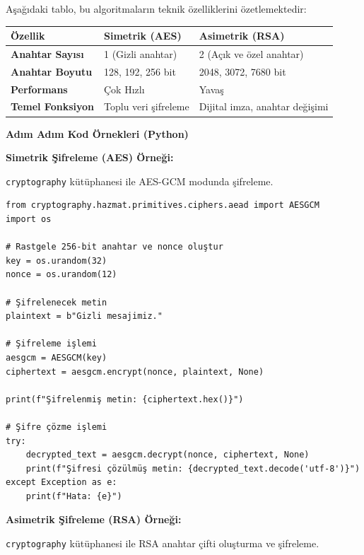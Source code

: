 Aşağıdaki tablo, bu algoritmaların teknik özelliklerini özetlemektedir:

\begin{center}
\begin{tabular}{|p{4cm}|p{6cm}|p{4cm}|}
\hline
\hline
\textbf{Özellik} & \textbf{Simetrik (AES)} & \textbf{Asimetrik (RSA)}  \\
\hline
\hline
\textbf{Anahtar Sayısı} & 1 (Gizli anahtar) & 2 (Açık ve özel anahtar)  \\
\hline
\hline
\textbf{Anahtar Boyutu} & 128, 192, 256 bit & 2048, 3072, 7680 bit  \\
\hline
\hline
\textbf{Performans} & Çok Hızlı & Yavaş  \\
\hline
\hline
\textbf{Temel Fonksiyon} & Toplu veri şifreleme & Dijital imza, anahtar değişimi  \\
\hline
\hline
\hline
\end{tabular}
\end{center}

\textbf{Adım Adım Kod Örnekleri (Python)}

\textbf{Simetrik Şifreleme (AES) Örneği:}

\texttt{cryptography} kütüphanesi ile AES-GCM modunda şifreleme.

\begin{verbatim}
from cryptography.hazmat.primitives.ciphers.aead import AESGCM
import os
 
# Rastgele 256-bit anahtar ve nonce oluştur
key = os.urandom(32)
nonce = os.urandom(12)
 
# Şifrelenecek metin
plaintext = b"Gizli mesajimiz."
 
# Şifreleme işlemi
aesgcm = AESGCM(key)
ciphertext = aesgcm.encrypt(nonce, plaintext, None)
 
print(f"Şifrelenmiş metin: {ciphertext.hex()}")
 
# Şifre çözme işlemi
try:
    decrypted_text = aesgcm.decrypt(nonce, ciphertext, None)
    print(f"Şifresi çözülmüş metin: {decrypted_text.decode('utf-8')}")
except Exception as e:
    print(f"Hata: {e}")
\end{verbatim}

\textbf{Asimetrik Şifreleme (RSA) Örneği:}

\texttt{cryptography} kütüphanesi ile RSA anahtar çifti oluşturma ve şifreleme.

